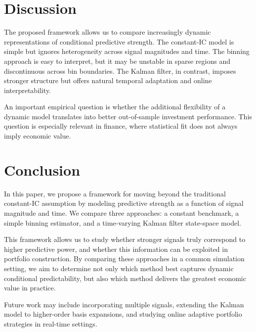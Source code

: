 \documentclass[11pt]{article}
\begin{document}
\section{Discussion}

The proposed framework allows us to compare increasingly dynamic representations of conditional predictive strength. The constant-IC model is simple but ignores heterogeneity across signal magnitudes and time. The binning approach is easy to interpret, but it may be unstable in sparse regions and discontinuous across bin boundaries. The Kalman filter, in contrast, imposes stronger structure but offers natural temporal adaptation and online interpretability.

An important empirical question is whether the additional flexibility of a dynamic model translates into better out-of-sample investment performance. This question is especially relevant in finance, where statistical fit does not always imply economic value.

\section{Conclusion}

In this paper, we propose a framework for moving beyond the traditional constant-IC assumption by modeling predictive strength as a function of signal magnitude and time. We compare three approaches: a constant benchmark, a simple binning estimator, and a time-varying Kalman filter state-space model.

This framework allows us to study whether stronger signals truly correspond to higher predictive power, and whether this information can be exploited in portfolio construction. By comparing these approaches in a common simulation setting, we aim to determine not only which method best captures dynamic conditional predictability, but also which method delivers the greatest economic value in practice.

Future work may include incorporating multiple signals, extending the Kalman model to higher-order basis expansions, and studying online adaptive portfolio strategies in real-time settings.
\end{document}
